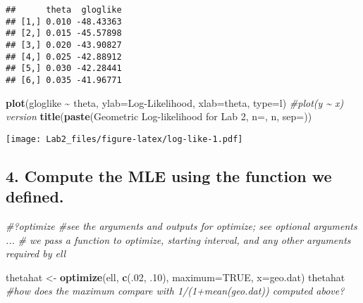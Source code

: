 \documentclass[
]{article}
\newenvironment{Shaded}{\begin{snugshade}}{\end{snugshade}}
\newcommand{\AttributeTok}[1]{\textcolor[rgb]{0.13,0.29,0.53}{#1}}
\newcommand{\CommentTok}[1]{\textcolor[rgb]{0.56,0.35,0.01}{\textit{#1}}}
\newcommand{\ConstantTok}[1]{\textcolor[rgb]{0.56,0.35,0.01}{#1}}
\newcommand{\DecValTok}[1]{\textcolor[rgb]{0.00,0.00,0.81}{#1}}
\newcommand{\FunctionTok}[1]{\textcolor[rgb]{0.13,0.29,0.53}{\textbf{#1}}}
\newcommand{\NormalTok}[1]{#1}
\newcommand{\OtherTok}[1]{\textcolor[rgb]{0.56,0.35,0.01}{#1}}
\newcommand{\SpecialCharTok}[1]{\textcolor[rgb]{0.81,0.36,0.00}{\textbf{#1}}}
\newcommand{\StringTok}[1]{\textcolor[rgb]{0.31,0.60,0.02}{#1}}
\begin{document}
\begin{verbatim}
##      theta  gloglike
## [1,] 0.010 -48.43363
## [2,] 0.015 -45.57898
## [3,] 0.020 -43.90827
## [4,] 0.025 -42.88912
## [5,] 0.030 -42.28441
## [6,] 0.035 -41.96771
\end{verbatim}

\begin{Shaded}
\begin{Highlighting}[]
\FunctionTok{plot}\NormalTok{(gloglike }\SpecialCharTok{\textasciitilde{}}\NormalTok{ theta, }\AttributeTok{ylab=}\StringTok{\textquotesingle{}Log{-}Likelihood\textquotesingle{}}\NormalTok{, }\AttributeTok{xlab=}\StringTok{\textquotesingle{}theta\textquotesingle{}}\NormalTok{, }\AttributeTok{type=}\StringTok{\textquotesingle{}l\textquotesingle{}}\NormalTok{) }\CommentTok{\#plot(y \textasciitilde{} x) version}
\FunctionTok{title}\NormalTok{(}\FunctionTok{paste}\NormalTok{(}\StringTok{\textquotesingle{}Geometric Log{-}likelihood for Lab 2, n=\textquotesingle{}}\NormalTok{, n, }\AttributeTok{sep=}\StringTok{\textquotesingle{}\textquotesingle{}}\NormalTok{))}
\end{Highlighting}
\end{Shaded}

\texttt{[image: Lab2\_files/figure-latex/log-like-1.pdf]}

\hypertarget{compute-the-mle-using-the-function-we-defined.}{%
\subsection{4. Compute the MLE using the function we
defined.}\label{compute-the-mle-using-the-function-we-defined.}}

\begin{Shaded}
\begin{Highlighting}[]
\CommentTok{\#?optimize   \#see the arguments and outputs for optimize; see optional arguments ...}
\CommentTok{\# we pass a function to optimize, starting interval, and any other arguments required by ell}

\NormalTok{thetahat }\OtherTok{\textless{}{-}} \FunctionTok{optimize}\NormalTok{(ell, }\FunctionTok{c}\NormalTok{(.}\DecValTok{02}\NormalTok{, .}\DecValTok{10}\NormalTok{), }\AttributeTok{maximum=}\ConstantTok{TRUE}\NormalTok{, }\AttributeTok{x=}\NormalTok{geo.dat)}
\NormalTok{thetahat   }\CommentTok{\#how does the maximum compare with 1/(1+mean(geo.dat)) computed above?}
\end{Highlighting}
\end{Shaded}
\end{document}
